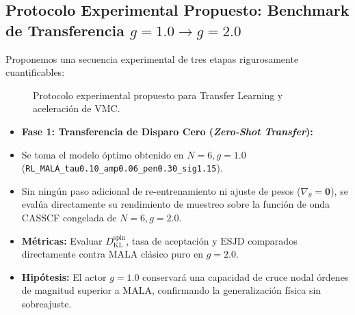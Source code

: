 \documentclass[10pt,a4paper]{article}
\begin{document}
\subsection{Protocolo Experimental Propuesto: Benchmark de Transferencia $g=1.0 \to g=2.0$}



Proponemos una secuencia experimental de tres etapas rigurosamente cuantificables:




\begin{figure}[H]
\centering
{}
\caption{Protocolo experimental propuesto para Transfer Learning y aceleración de VMC.}
\end{figure}



\begin{itemize}
\item \textbf{Fase 1: Transferencia de Disparo Cero (\textit{Zero-Shot Transfer}):}
\item Se toma el modelo óptimo obtenido en $N=6, g=1.0$ (\texttt{RL\_MALA\_tau0.10\_amp0.06\_pen0.30\_sig1.15}).
\item Sin ningún paso adicional de re-entrenamiento ni ajuste de pesos ($\nabla_\theta = \mathbf{0}$), se evalúa directamente su rendimiento de muestreo sobre la función de onda CASSCF congelada de $N=6, g=2.0$.
\item \textbf{Métricas:} Evaluar $D_{\mathrm{KL}}^{\mathrm{spin}}$, tasa de aceptación y $\mathrm{ESJD}$ comparados directamente contra MALA clásico puro en $g=2.0$.
\item \textbf{Hipótesis:} El actor $g=1.0$ conservará una capacidad de cruce nodal órdenes de magnitud superior a MALA, confirmando la generalización física sin sobreajuste.
\end{itemize}
\end{document}
